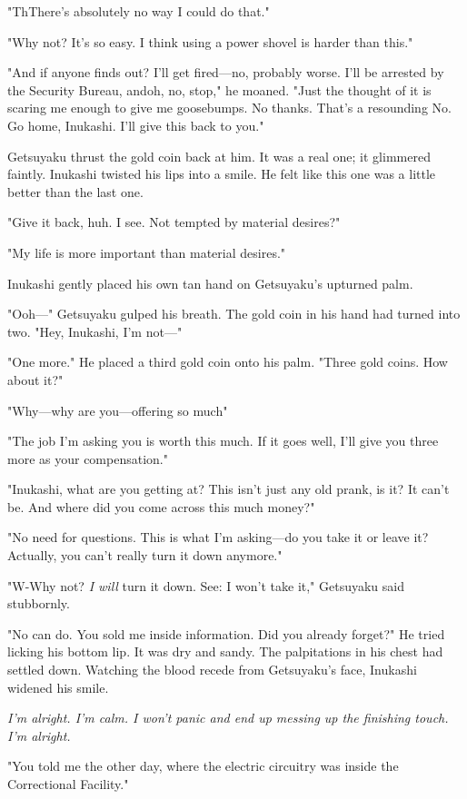 "Th\el There's absolutely no way I could do that."

"Why not? It's so easy. I think using a power shovel is harder than
this."

"And if anyone finds out? I'll get fired---no, probably worse. I'll be
arrested by the Security Bureau, and\el oh, no, stop," he moaned. "Just
the thought of it is scaring me enough to give me goosebumps. No thanks.
That's a resounding No. Go home, Inukashi. I'll give this back to you."

Getsuyaku thrust the gold coin back at him. It was a real one; it
glimmered faintly. Inukashi twisted his lips into a smile. He felt like
this one was a little better than the last one.

"Give it back, huh. I see. Not tempted by material desires?"

"My life is more important than material desires."

Inukashi gently placed his own tan hand on Getsuyaku's upturned palm.

"Ooh---" Getsuyaku gulped his breath. The gold coin in his hand had turned
into two. "Hey, Inukashi, I'm not---"

"One more." He placed a third gold coin onto his palm. "Three gold
coins. How about it?"

"Why---why are you---offering so much\el "

"The job I'm asking you is worth this much. If it goes well, I'll give
you three more as your compensation."

"Inukashi, what are you getting at? This isn't just any old prank, is
it? It can't be. And where did you come across this much money?"

"No need for questions. This is what I'm asking---do you take it or leave
it? Actually, you can't really turn it down anymore."

"W-Why not? \emph{I will} turn it down. See: I won't take it," Getsuyaku said
stubbornly.

"No can do. You sold me inside information. Did you already forget?" He
tried licking his bottom lip. It was dry and sandy. The palpitations in
his chest had settled down. Watching the blood recede from Getsuyaku's
face, Inukashi widened his smile.

\emph{I'm alright. I'm calm. I won't panic and end up messing up the finishing
touch. I'm alright.}

"You told me the other day, where the electric circuitry was inside the
Correctional Facility."

